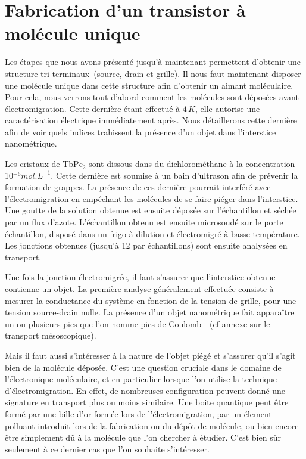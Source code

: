 \section{Fabrication d'un transistor à molécule unique}
Les étapes que nous avons présenté jusqu'à maintenant permettent d'obtenir une structure tri-terminaux~(source, drain et grille). Il nous faut maintenant disposer une molécule unique dans cette structure afin d'obtenir un aimant moléculaire. Pour cela, nous verrons tout d'abord comment les molécules sont déposées avant électromigration. Cette dernière étant effectué à $4\,K$, elle autorise une caractérisation électrique immédiatement après. Nous détaillerons cette dernière afin de voir quels indices trahissent la présence d'un objet dans l'interstice nanométrique.

Les cristaux de TbPc$_{2}$ sont dissous dans du dichlorométhane à la concentration 10$^{-6}mol.L^{-1}$. Cette dernière est soumise à un bain d'ultrason afin de prévenir la formation de grappes. La présence de ces dernière pourrait interféré avec l'électromigration en empéchant les molécules de se faire piéger dans l'interstice. Une goutte de la solution obtenue est ensuite déposée sur l'échantillon et séchée par un flux d'azote. L'échantillon obtenu est ensuite microsoudé sur le porte échantillon, disposé dans un frigo à dilution et électromigré à basse température. Les jonctions obtenues (jusqu'à 12 par échantillons) sont ensuite analysées en transport.

Une fois la jonction électromigrée, il faut s'assurer que l'interstice obtenue contienne un objet. La première analyse généralement effectuée consiste à mesurer la conductance du système en fonction de la tension de grille, pour une tension source-drain nulle. La présence d'un objet nanométrique fait apparaître un ou plusieurs pics que l'on nomme pics de Coulomb~\cite{Beenakker1991,Wiel2002,Hanson2007}~(cf annexe sur le transport mésoscopique). 

Mais il faut aussi s'intéresser à la nature de l'objet piégé et s'assurer qu'il s'agit bien de la molécule déposée. C'est une question cruciale dans le domaine de l'électronique moléculaire, et en particulier lorsque l'on utilise la technique d'électromigration. En effet, de nombreuses configuration peuvent donné une signature en transport plus ou moins similaire. Une boite quantique peut \^etre formé par une bille d'or formée lors de l'électromigration, par un élement polluant introduit lors de la fabrication ou du dép\^ot de molécule, ou bien encore \^etre simplement d\^u à la molécule que l'on chercher à étudier. C'est bien s\^ur seulement à ce dernier cas que l'on souhaite s'intéresser.

